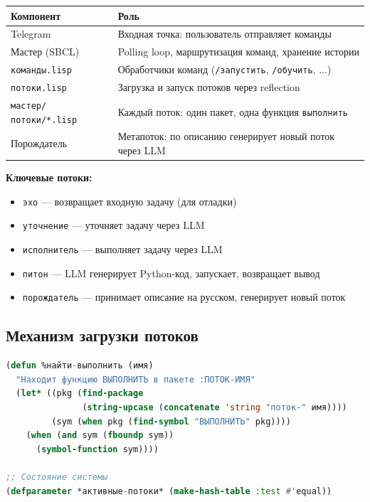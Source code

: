 \documentclass[10pt, oneside]{article}
\begin{document}
\begin{center}
\begin{tabular}{ll}
  \toprule
  \textbf{Компонент} & \textbf{Роль} \\
  \midrule
  Telegram         & Входная точка: пользователь отправляет команды \\
  Мастер (SBCL)    & Polling loop, маршрутизация команд, хранение истории \\
  \texttt{команды.lisp} & Обработчики команд (\texttt{/запустить}, \texttt{/обучить}, ...) \\
  \texttt{потоки.lisp}  & Загрузка и запуск потоков через reflection \\
  \texttt{мастер/потоки/*.lisp} & Каждый поток: один пакет, одна функция \texttt{выполнить} \\
  Порождатель      & Метапоток: по описанию генерирует новый поток через LLM \\
  \bottomrule
\end{tabular}
\end{center}

\textbf{Ключевые потоки:}

\begin{itemize}[leftmargin=1.5em]
  \item \texttt{эхо} --- возвращает входную задачу (для отладки)
  \item \texttt{уточнение} --- уточняет задачу через LLM
  \item \texttt{исполнитель} --- выполняет задачу через LLM
  \item \texttt{питон} --- LLM генерирует Python-код, запускает, возвращает вывод
  \item \texttt{порождатель} --- принимает описание на русском, генерирует новый поток
\end{itemize}

\subsection{Механизм загрузки потоков}

\begin{lstlisting}[language=CommonLisp,caption={Reflection-based поиск функции выполнить}]
(defun %найти-выполнить (имя)
  "Находит функцию ВЫПОЛНИТЬ в пакете :ПОТОК-ИМЯ"
  (let* ((pkg (find-package
               (string-upcase (concatenate 'string "поток-" имя))))
         (sym (when pkg (find-symbol "ВЫПОЛНИТЬ" pkg))))
    (when (and sym (fboundp sym))
      (symbol-function sym))))

;; Состояние системы
(defparameter *активные-потоки* (make-hash-table :test #'equal))
\end{lstlisting}
\end{document}
